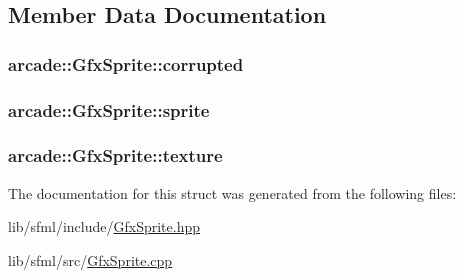 \subsection{Member Data Documentation}
\hypertarget{structarcade_1_1_gfx_sprite_a551b4cbde82e7a2285c3201f7ba47b11}{
\subsubsection[{corrupted}]{ arcade\-::\-Gfx\-Sprite\-::corrupted}}\label{structarcade_1_1_gfx_sprite_a551b4cbde82e7a2285c3201f7ba47b11}
\hypertarget{structarcade_1_1_gfx_sprite_a76a2f5789cf0bd8b75d5de4eeabafa2b}{
\subsubsection[{sprite}]{ arcade\-::\-Gfx\-Sprite\-::sprite}}\label{structarcade_1_1_gfx_sprite_a76a2f5789cf0bd8b75d5de4eeabafa2b}
\hypertarget{structarcade_1_1_gfx_sprite_a7d7572b60fbd3af021ffee80b9c5d5bc}{
\subsubsection[{texture}]{ arcade\-::\-Gfx\-Sprite\-::texture}}\label{structarcade_1_1_gfx_sprite_a7d7572b60fbd3af021ffee80b9c5d5bc}


The documentation for this struct was generated from the following files\-:\begin{DoxyCompactItemize}
\item 
lib/sfml/include/\hyperlink{_gfx_sprite_8hpp}{Gfx\-Sprite.\-hpp}\item 
lib/sfml/src/\hyperlink{_gfx_sprite_8cpp}{Gfx\-Sprite.\-cpp}\end{DoxyCompactItemize}
